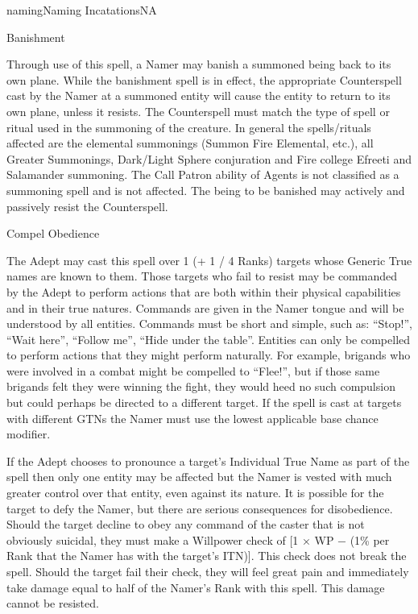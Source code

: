 \begin{College}[2.0]{naming}{Naming Incatations}{NA}
\begin{spell}[S-2]{Banishment}

\begin{effects}
Through use of this spell, a Namer may banish a summoned being back to
its own plane.  While the banishment spell is in effect, the
appropriate Counterspell cast by the Namer at a summoned entity will
cause the entity to return to its own plane, unless it resists. The
Counterspell must match the type of spell or ritual used in the
summoning of the creature. In general the spells/rituals affected are
the elemental summonings (Summon Fire Elemental, etc.), all Greater
Summonings, Dark/Light Sphere conjuration and Fire college Efreeti and
Salamander summoning.  The Call Patron ability of Agents is not
classified as a summoning spell and is not affected.  The being to be
banished may actively and passively resist the Counterspell.
\end{effects}
\end{spell}

\begin{spell}[S-3]{Compel Obedience}

\begin{effects}
The Adept may cast this spell over 1 (+ 1 / 4 Ranks) targets whose
Generic True names are known to them.  Those targets who fail to
resist may be commanded by the Adept to perform actions that are
both within their physical capabilities and in their true natures.
Commands are given in the Namer tongue and will be understood by all
entities. Commands must be short and simple, such as: “Stop!”, “Wait
here”, “Follow me”, “Hide under the table”. Entities can only be
compelled to perform actions that they might perform naturally.  For
example, brigands who were involved in a combat might be compelled to
“Flee!”, but if those same brigands felt they were winning the fight,
they would heed no such compulsion but could perhaps be directed to a
different target. If the spell is cast at targets with different GTNs
the Namer must use the lowest applicable base chance modifier.

If the Adept chooses to pronounce a target’s Individual True Name as
part of the spell then only one entity may be affected but the Namer
is vested with much greater control over that entity, even against its
nature.  It is possible for the target to defy the Namer, but there
are serious consequences for disobedience. Should the target decline
to obey any command of the caster that is not obviously suicidal, they
must make a Willpower check of [1 × WP − (1\% per Rank that the Namer
has with the target’s ITN)]. This check does not break the spell.
Should the target fail their check, they will feel great pain and
immediately take damage equal to half of the Namer’s Rank with this
spell. This damage cannot be resisted.
\end{effects}
\end{spell}


\end{College}
